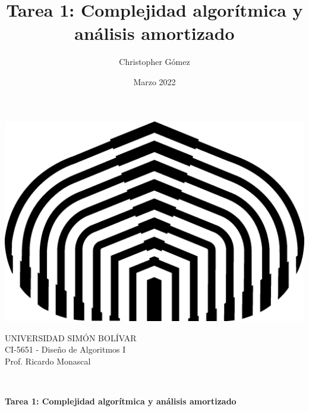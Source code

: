 \documentclass[letterpaper, 12pt]{article}
\title{Tarea 1: Complejidad algorítmica y análisis amortizado}
\author{Christopher Gómez}
\date{Marzo 2022}
\begin{document}
\parbox[t]{.5\linewidth}{
    \centering
    \includegraphics[scale=0.4]{logo.png}
    \begin{center}
        UNIVERSIDAD SIMÓN BOLÍVAR \\
        CI-5651 - Diseño de Algoritmos I \\
        Prof. Ricardo Monascal \\
    \end{center}
}
\hfill {}

\phantom{This text will be invisible} \\
\centerline {\textbf{Tarea 1: Complejidad algorítmica y análisis amortizado}}
\justify
\end{document}
